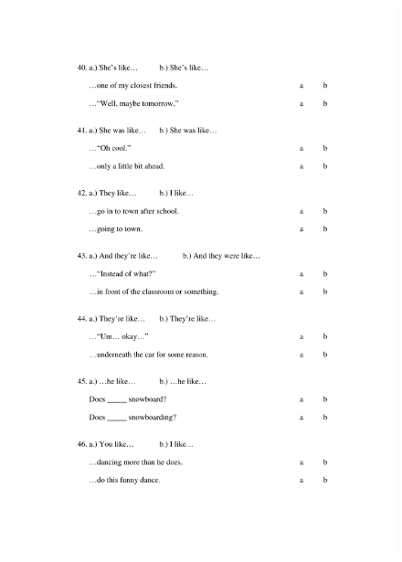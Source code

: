 \begin{figure}[htbp]
	\centering
		\includegraphics[width=5in]{images/Exp1page7.pdf}
	\label{x1p7}
\end{figure}

